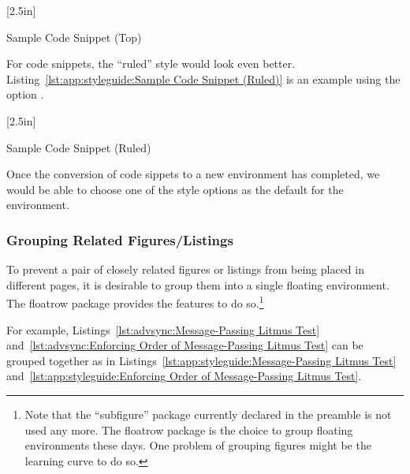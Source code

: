 \begin{listing}\RawFloats
{ \scriptsize
{}
}
\begin{floatrow}[1]
  [2.5in]{\caption{Sample Code Snippet (Top)}
    \label{lst:app:styleguide:Sample Code Snippet (Top)}}{
\theverbbox
}
\end{floatrow}
\end{listing}

For code snippets, the ``ruled'' style would look even better.
Listing~\ref{lst:app:styleguide:Sample Code Snippet (Ruled)}
is an example using the option .

\begin{listing}\RawFloats
{ \scriptsize
{}
}
\begin{floatrow}[1]
  [2.5in]{\caption{Sample Code Snippet (Ruled)}
    \label{lst:app:styleguide:Sample Code Snippet (Ruled)}}{
\theverbbox
}
\end{floatrow}
\end{listing}

Once the conversion of code sippets to a new environment has
completed, we would be able to choose one of the style options
as the default for the environment.

\subsubsection{Grouping Related Figures/Listings}
\label{sec:app:styleguide:Grouping Related Figures/Listings}

To prevent a pair of closely related figures or listings
from being placed in different pages, it is desirable to group
them into a single floating environment.
The floatrow package provides the features to do so.\footnote{
  Note that the ``subfigure'' package currently declared in the
  preamble is not used any more.
  The floatrow package is the choice to group floating environments
  these days.
  One problem of grouping figures might be the learning curve
  to do so.}

For example,
Listings~\ref{lst:advsync:Message-Passing Litmus Test}
and~\ref{lst:advsync:Enforcing Order of Message-Passing Litmus Test}
can be grouped together as in
Listings~\ref{lst:app:styleguide:Message-Passing Litmus Test}
and~\ref{lst:app:styleguide:Enforcing Order of Message-Passing Litmus Test}.

